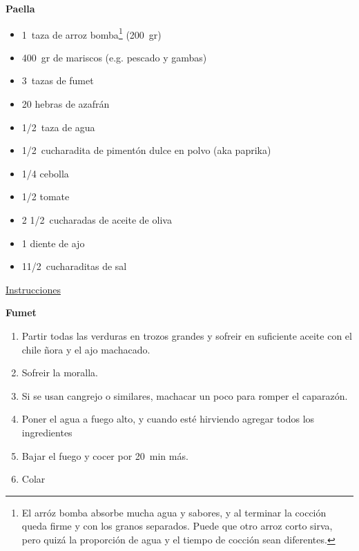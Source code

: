 \textbf{Paella}
\begin{itemize}
\item \SI{1}{taza} de arroz bomba\footnote{El arróz bomba absorbe mucha agua y sabores, y al terminar la cocción queda firme y con los granos separados. Puede que otro arroz corto sirva, pero quizá la proporción de agua y el tiempo de cocción sean diferentes.} (\SI{200}{gr})
\item \SI{400}{gr} de mariscos (e.g. pescado y gambas)
\item \SI{3}{tazas} de fumet
\item 20 hebras de azafrán
\item \SI{1/2}{taza} de agua
\item \SI{1/2}{cucharadita} de pimentón dulce en polvo (aka paprika)
\item \num{1/4} cebolla
\item \num{1/2} tomate
\item 2 \SI{1/2}{cucharadas} de aceite de oliva
\item 1 diente de ajo
\item 1\SI{1/2}{cucharaditas} de sal
\end{itemize}

\underline{Instrucciones}

\textbf{Fumet}
\begin{enumerate}
\item Partir todas las verduras en trozos grandes y sofreir en suficiente aceite con el chile ñora y el ajo machacado.
\item Sofreir la moralla.
\item Si se usan cangrejo o similares, machacar un poco para romper el caparazón.
\item Poner el agua a fuego alto, y cuando esté hirviendo agregar todos los ingredientes
\item Bajar el fuego y cocer por \SI{20}{min} más.
\item Colar
\end{enumerate}

